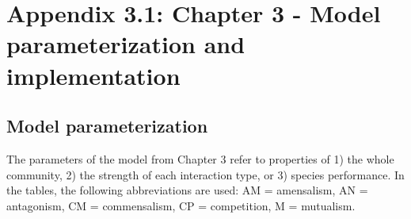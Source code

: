 \chapter[Appendix 3.1: Chapter 3 - Model parameterization]{Appendix 3.1: Chapter 3 - Model parameterization and implementation}\label{ch:Appendix3.1}
\renewcommand{\thefigure}{A.3.1.\arabic{figure}}
\setcounter{figure}{0}

\renewcommand{\thetable}{A.3.1.\arabic{table}}
\setcounter{table}{0}

\section*{Model parameterization}\label{model-parameterization}

The parameters of the model from Chapter 3 refer to properties of 1) the whole community, 2) the strength of each interaction type, or 3) species performance. In the tables, the following abbreviations are used: AM = amensalism, AN = antagonism, CM = commensalism, CP = competition, M = mutualism.

